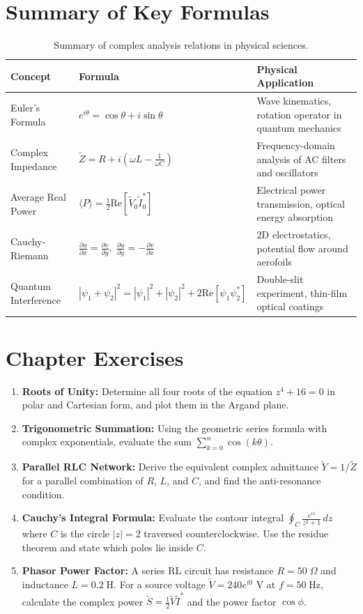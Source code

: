 \section{Summary of Key Formulas}
\begin{table}[H]
\centering
\small
\begin{tabularx}{\textwidth}{llX}
\toprule
\textbf{Concept} & \textbf{Formula} & \textbf{Physical Application} \\
\midrule
Euler's Formula & $e^{i\theta} = \cos\theta + i\sin\theta$ & Wave kinematics, rotation operator in quantum mechanics \\
Complex Impedance & $\tilde{Z} = R + i(\omega L - \frac{1}{\omega C})$ & Frequency-domain analysis of AC filters and oscillators \\
Average Real Power & $\langle P \rangle = \frac{1}{2}\text{Re}[\tilde{V}_0 \tilde{I}_0^*]$ & Electrical power transmission, optical energy absorption \\
Cauchy-Riemann & $\frac{\partial u}{\partial x} = \frac{\partial v}{\partial y}, \; \frac{\partial u}{\partial y} = -\frac{\partial v}{\partial x}$ & 2D electrostatics, potential flow around aerofoils \\
Quantum Interference & $|\psi_1 + \psi_2|^2 = |\psi_1|^2 + |\psi_2|^2 + 2\text{Re}[\psi_1\psi_2^*]$ & Double-slit experiment, thin-film optical coatings \\
\bottomrule
\end{tabularx}
\caption{Summary of complex analysis relations in physical sciences.}
\label{tab:ch04_summary}
\end{table}

\section{Chapter Exercises}
\begin{enumerate}
    \item \textbf{Roots of Unity:} Determine all four roots of the equation $z^4 + 16 = 0$ in polar and Cartesian form, and plot them in the Argand plane.
    \item \textbf{Trigonometric Summation:} Using the geometric series formula with complex exponentials, evaluate the sum $\sum_{k=0}^n \cos(k\theta)$.
    \item \textbf{Parallel RLC Network:} Derive the equivalent complex admittance $\tilde{Y} = 1/\tilde{Z}$ for a parallel combination of $R$, $L$, and $C$, and find the anti-resonance condition.
    \item \textbf{Cauchy's Integral Formula:} Evaluate the contour integral $\oint_C \frac{e^{iz}}{z^2 + 1}\,dz$ where $C$ is the circle $|z| = 2$ traversed counterclockwise. Use the residue theorem and state which poles lie inside $C$.
    \item \textbf{Phasor Power Factor:} A series RL circuit has resistance $R = 50\;\Omega$ and inductance $L = 0.2\;\text{H}$. For a source voltage $\tilde{V} = 240e^{i0}$ V at $f = 50\;\text{Hz}$, calculate the complex power $\tilde{S} = \frac{1}{2}\tilde{V}\tilde{I}^*$ and the power factor $\cos\phi$.
\end{enumerate}
